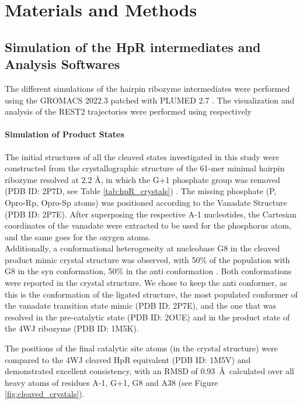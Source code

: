 \documentclass[journal=jacsat,manuscript=article]{achemso}
\begin{document}



\section{Materials and Methods}

\subsection{Simulation of the HpR intermediates and Analysis Softwares}

The different simulations of the hairpin ribozyme intermediates were performed using the GROMACS 2022.3 \cite{abraham_gromacs_2015} patched with PLUMED 2.7 \cite{tribello_plumed_2014, the_plumed_consortium_promoting_2019}.
The visualization and analysis of the REST2 trajectories were performed using respectively 
\paragraph{Simulation of Product States}
The initial structures of all the cleaved states investigated in this study were constructed
from the crystallographic structure of the 61-mer minimal hairpin ribozyme resolved at 2.2 \AA,
in which the G+1 phosphate group was removed (PDB ID: 2P7D, see Table \ref{tab:hpR_crystals}) \cite{torelli_comparison_2007}.
The missing phosphate (P, Opro-Rp, Opro-Sp atoms) was positioned according to the Vanadate Structure (PDB ID: 2P7E).
After superposing the respective A-1 nucleotides, 
the Cartesian coordinates of the vanadate were extracted to be used for the phosphorus atom, and the same goes for the oxygen atoms.\\
Additionally, a conformational heterogeneity at nucleobase G8 in the cleaved product mimic crystal structure was observed, 
with 50\% of the population with G8 in the syn conformation, 50\% in the anti conformation \cite{torelli_comparison_2007}.
Both conformations were reported in the crystal structure. 
We chose to keep the anti conformer, as this is the conformation of the ligated structure, 
the most populated conformer of the vanadate transition state mimic (PDB ID: 2P7E), 
and the one that was resolved in the pre-catalytic state (PDB ID: 2OUE) and in the product state of the 4WJ ribozyme (PDB ID: 1M5K).

The positions of the final catalytic site atoms (in the crystal structure) were compared to the 4WJ cleaved HpR equivalent (PDB ID: 1M5V)
and demonstrated excellent consistency, with an RMSD of 0.93~\AA\ calculated over all heavy atoms of residues A-1, G+1, G8 and A38 (see Figure \ref{fig:cleaved_crystals}).
\end{document}
